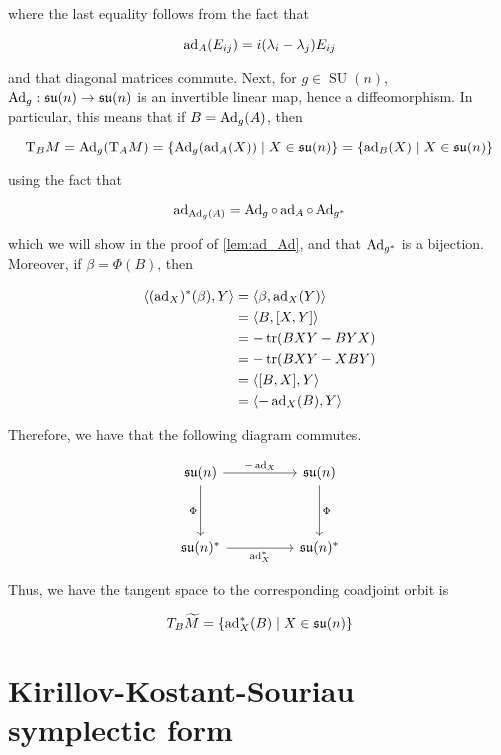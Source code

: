 \documentclass{article}
\DeclareMathOperator{\SU}{SU}
\newcommand{\su}{\mathfrak{su}}
\renewcommand{\tilde}{\widetilde}
\begin{document}
where the last equality follows from the fact that

\[\operatorname{ad}_A(E_{ij}) = i(\lambda_i - \lambda_j)E_{ij}\]

and that diagonal matrices commute. Next, for \(g \in \SU(n)\), \(\Ad_g : \su(n) \to \su(n)\) is an invertible linear map, hence a diffeomorphism. In particular, this means that if \(B = \operatorname{Ad}_g(A)\), then

\begin{equation}
    \label{eq:tangent-space}
    \TT_B M = \Ad_g(\TT_A M) = \left\{\Ad_g(\ad_A(X)) \mid X \in \su(n)\right\} = \left\{\ad_B(X) \mid X \in \su(n)\right\}
\end{equation}

using the fact that

\[\operatorname{ad}_{\operatorname{Ad}_g(A)} = \operatorname{Ad}_g \circ \operatorname{ad}_A \circ \operatorname{Ad}_{g^*}\]

which we will show in the proof of \cref{lem:ad_Ad}, and that \(\operatorname{Ad}_{g^*}\) is a bijection. Moreover, if \(\beta= \Phi(B)\), then

\begin{align*}
    \left\langle (\operatorname{ad}_X)^*(\beta), Y \right\rangle &= \left\langle \beta, \operatorname{ad}_X(Y) \right\rangle \\
    &= \left\langle B, [X, Y] \right\rangle \\
    &= -\tr(BXY - BYX) \\
    &= -\tr(BXY - XBY) \\
    &= \left\langle [B, X], Y \right\rangle \\
    &= \left\langle -\operatorname{ad}_X(B), Y \right\rangle
\end{align*}

Therefore, we have that the following diagram commutes.

\[\begin{tikzcd}
	{\su(n)} && {\su(n)} \\
	\\
	{\su(n)^*} && {\su(n)^*}
	\arrow["\Phi"', from=1-1, to=3-1]
	\arrow["\Phi", from=1-3, to=3-3]
	\arrow["{-\ad_X}", from=1-1, to=1-3]
	\arrow["{\ad_X^*}"', from=3-1, to=3-3]
\end{tikzcd}\]

Thus, we have the tangent space to the corresponding coadjoint orbit is

\[T_B \tilde M = \left\{\ad_X^*(B) \mid X \in \su(n)\right\}\]

\section{Kirillov-Kostant-Souriau symplectic form}
\end{document}
